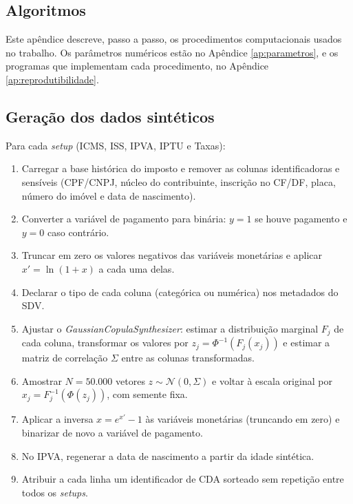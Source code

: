 \begin{apendicesenv}

\partapendices

\chapter{Algoritmos}
\label{ap:algoritmos}

Este apêndice descreve, passo a passo, os procedimentos computacionais usados no trabalho. Os parâmetros numéricos estão no Apêndice \ref{ap:parametros}, e os programas que implementam cada procedimento, no Apêndice \ref{ap:reprodutibilidade}.

\section{Geração dos dados sintéticos}
\label{ap:alg_sintese}

Para cada \textit{setup} (ICMS, ISS, IPVA, IPTU e Taxas):

\begin{enumerate}
    \item Carregar a base histórica do imposto e remover as colunas identificadoras e sensíveis (CPF/CNPJ, núcleo do contribuinte, inscrição no CF/DF, placa, número do imóvel e data de nascimento).
    \item Converter a variável de pagamento para binária: $y = 1$ se houve pagamento e $y = 0$ caso contrário.
    \item Truncar em zero os valores negativos das variáveis monetárias e aplicar $x' = \ln(1 + x)$ a cada uma delas.
    \item Declarar o tipo de cada coluna (categórica ou numérica) nos metadados do SDV.
    \item Ajustar o \textit{GaussianCopulaSynthesizer}: estimar a distribuição marginal $F_j$ de cada coluna, transformar os valores por $z_j = \Phi^{-1}(F_j(x_j))$ e estimar a matriz de correlação $\Sigma$ entre as colunas transformadas.
    \item Amostrar $N = 50.000$ vetores $z \sim \mathcal{N}(0, \Sigma)$ e voltar à escala original por $x_j = F_j^{-1}(\Phi(z_j))$, com semente fixa.
    \item Aplicar a inversa $x = e^{x'} - 1$ às variáveis monetárias (truncando em zero) e binarizar de novo a variável de pagamento.
    \item No IPVA, regenerar a data de nascimento a partir da idade sintética.
    \item Atribuir a cada linha um identificador de CDA sorteado sem repetição entre todos os \textit{setups}.
\end{enumerate}


\end{apendicesenv}
